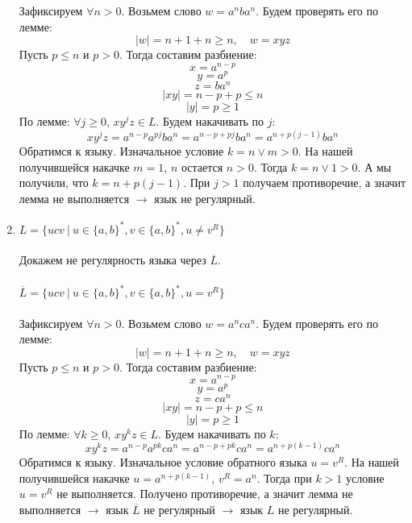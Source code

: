 \documentclass{article}
\begin{document}
\begin{enumerate}
    Зафиксируем $\forall n > 0$. Возьмем слово $w = a^n b a^n$. Будем проверять его по лемме:
    $$ |w| = n + 1 + n \geq n, \quad w = xyz $$ 
    Пусть $ p \leq n$ и $ p > 0 $. Тогда составим разбиение:
    $$ x = a^{n - p} $$
    $$ y = a^p $$
    $$ z = b a^n $$
    $$ |xy| = n - p + p \leq n $$
    $$ |y| = p \geq 1 $$
    По лемме: $\forall j \geq 0$,  $xy^jz \in L$.
    Будем накачивать по $j$:
    $$ xy^jz = a^{n - p} a^{pj} b a^n = a^{n - p + pj}b a^n = a^{n + p(j-1)}b a^n$$
    Обратимся к языку. Изначальное условие $ k = n \vee m > 0 $. На нашей получившейся накачке $ m = 1 $, $ n $ остается $ n > 0 $. Тогда $ k = n \vee 1 > 0 $. А мы получили, что $ k = n + p(j-1)$. При $j > 1$ получаем противоречие, а значит лемма не выполняется $ \xrightarrow[]{}$ язык не регулярный. 
    \item {$L = \{ ucv \ | \ u \in \{ a,b \}^*, v \in \{ a,b\}^* , u \neq v^R \}$ } \\ \\
    Докажем не регулярность языка через $\overline L$. \\ \\
    $\overline L = \{ ucv \ | \ u \in \{ a,b \}^*, v \in \{ a,b\}^* , u = v^R \}$ \\ \\
    Зафиксируем $\forall n > 0$. Возьмем слово $w = a^{n} c a^{n}$. Будем проверять его по лемме:
    $$ |w| = n + 1 + n \geq n, \quad w = xyz $$ 
    Пусть $ p \leq n$ и $ p > 0 $. Тогда составим разбиение:
    $$ x = a^{n - p} $$
    $$ y = a^p $$
    $$ z = c a^n $$
    $$ |xy| = n - p + p \leq n $$
    $$ |y| = p \geq 1 $$
    По лемме: $\forall k \geq 0$,  $xy^kz \in L$.
    Будем накачивать по $k$:
    $$ xy^kz = a^{n - p} a^{pk} c a^n = a^{n - p + pk} c a^n = a^{n + p(k-1)} c a^n $$
    Обратимся к языку. Изначальное условие обратного языка $ u = v^R $. На нашей получившейся накачке $ u = a^{n+p(k-1)} $, $ v^R = a^n $. Тогда при $k > 1$ условие $ u = v^R $ не выполняется. Получено противоречие, а значит лемма не выполняется $ \xrightarrow[]{}$ язык $\overline L$ не регулярный $ \xrightarrow[]{}$ язык $L$ не регулярный.
\end{enumerate}
\end{document}
